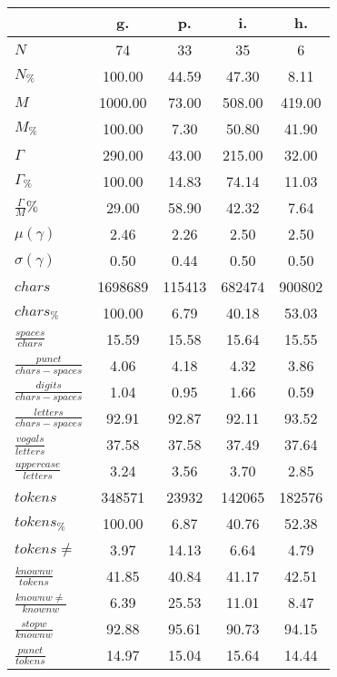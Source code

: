 \begin{table}[h!]
\begin{center}
\begin{tabular}{| l || c | c | c | c |}\hline
 & {\bf g.} & {\bf p.} & {\bf i.} & {\bf h.} \\\hline\hline
$N$ & 74  & 33  & 35  & 6 \\
$N_{\%}$ & 100.00  & 44.59  & 47.30  & 8.11 \\\hline
$M$ & 1000.00  & 73.00  & 508.00  & 419.00 \\
$M_{\%}$ & 100.00  & 7.30  & 50.80  & 41.90 \\\hline
$\Gamma$ & 290.00  & 43.00  & 215.00  & 32.00 \\
$\Gamma_{\%}$ & 100.00  & 14.83  & 74.14  & 11.03 \\\hline
$\frac{\Gamma}{M}\%$ & 29.00  & 58.90  & 42.32  & 7.64 \\
$\mu(\gamma)$ & 2.46  & 2.26  & 2.50  & 2.50 \\
$\sigma(\gamma)$ & 0.50  & 0.44  & 0.50  & 0.50 \\\hline\hline
$chars$ & 1698689  & 115413  & 682474  & 900802 \\
$chars_{\%}$ & 100.00  & 6.79  & 40.18  & 53.03 \\\hline
$\frac{spaces}{chars}$ & 15.59  & 15.58  & 15.64  & 15.55 \\
$\frac{punct}{chars-spaces}$ & 4.06  & 4.18  & 4.32  & 3.86 \\
$\frac{digits}{chars-spaces}$ & 1.04  & 0.95  & 1.66  & 0.59 \\\hline
$\frac{letters}{chars-spaces}$ & 92.91  & 92.87  & 92.11  & 93.52 \\
$\frac{vogals}{letters}$ & 37.58  & 37.58  & 37.49  & 37.64 \\
$\frac{uppercase}{letters}$ & 3.24  & 3.56  & 3.70  & 2.85 \\\hline\hline
$tokens$ & 348571  & 23932  & 142065  & 182576 \\
$tokens_{\%}$ & 100.00  & 6.87  & 40.76  & 52.38 \\
$tokens \neq$ & 3.97  & 14.13  & 6.64  & 4.79 \\\hline
$\frac{knownw}{tokens}$ & 41.85  & 40.84  & 41.17  & 42.51 \\
$\frac{knownw \neq}{knownw}$ & 6.39  & 25.53  & 11.01  & 8.47 \\\hline
$\frac{stopw}{knownw}$ & 92.88  & 95.61  & 90.73  & 94.15 \\
$\frac{punct}{tokens}$ & 14.97  & 15.04  & 15.64  & 14.44 \\

\end{tabular}
\end{center}
\end{table}
